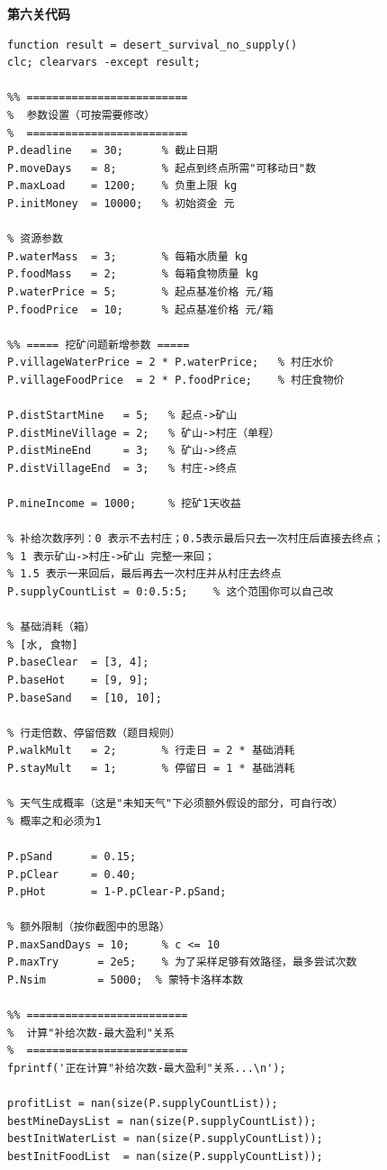 \textbf{第六关代码}
\begin{verbatim}
function result = desert_survival_no_supply()
clc; clearvars -except result;

%% =========================
%  参数设置（可按需要修改）
%  =========================
P.deadline   = 30;      % 截止日期
P.moveDays   = 8;       % 起点到终点所需"可移动日"数
P.maxLoad    = 1200;    % 负重上限 kg
P.initMoney  = 10000;   % 初始资金 元

% 资源参数
P.waterMass  = 3;       % 每箱水质量 kg
P.foodMass   = 2;       % 每箱食物质量 kg
P.waterPrice = 5;       % 起点基准价格 元/箱
P.foodPrice  = 10;      % 起点基准价格 元/箱

%% ===== 挖矿问题新增参数 =====
P.villageWaterPrice = 2 * P.waterPrice;   % 村庄水价
P.villageFoodPrice  = 2 * P.foodPrice;    % 村庄食物价

P.distStartMine   = 5;   % 起点->矿山
P.distMineVillage = 2;   % 矿山->村庄（单程）
P.distMineEnd     = 3;   % 矿山->终点
P.distVillageEnd  = 3;   % 村庄->终点

P.mineIncome = 1000;     % 挖矿1天收益

% 补给次数序列：0 表示不去村庄；0.5表示最后只去一次村庄后直接去终点；
% 1 表示矿山->村庄->矿山 完整一来回；
% 1.5 表示一来回后，最后再去一次村庄并从村庄去终点
P.supplyCountList = 0:0.5:5;    % 这个范围你可以自己改

% 基础消耗（箱）
% [水, 食物]
P.baseClear  = [3, 4];
P.baseHot    = [9, 9];
P.baseSand   = [10, 10];

% 行走倍数、停留倍数（题目规则）
P.walkMult   = 2;       % 行走日 = 2 * 基础消耗
P.stayMult   = 1;       % 停留日 = 1 * 基础消耗

% 天气生成概率（这是"未知天气"下必须额外假设的部分，可自行改）
% 概率之和必须为1

P.pSand      = 0.15;
P.pClear     = 0.40;
P.pHot       = 1-P.pClear-P.pSand;

% 额外限制（按你截图中的思路）
P.maxSandDays = 10;     % c <= 10
P.maxTry      = 2e5;    % 为了采样足够有效路径，最多尝试次数
P.Nsim        = 5000;  % 蒙特卡洛样本数

%% =========================
%  计算"补给次数-最大盈利"关系
%  =========================
fprintf('正在计算"补给次数-最大盈利"关系...\n');

profitList = nan(size(P.supplyCountList));
bestMineDaysList = nan(size(P.supplyCountList));
bestInitWaterList = nan(size(P.supplyCountList));
bestInitFoodList  = nan(size(P.supplyCountList));


\end{verbatim}
